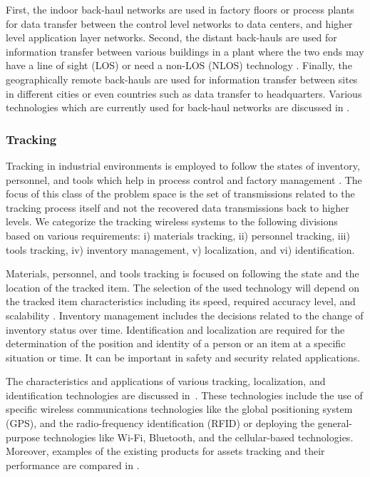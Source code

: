 First, the indoor back-haul networks are used in factory floors or process plants for data transfer between the control level networks to data centers, and higher level application layer networks. Second, the distant back-hauls are used for information transfer between various buildings in a plant where the two ends  may have a line of sight (LOS) or need a non-LOS (NLOS) technology \cite{PS-backhaul}. Finally, the geographically remote back-hauls are used for information transfer between sites in different cities or even countries such as data transfer to headquarters. Various technologies which are currently used for back-haul networks are discussed in \cite{PS-backhaul}.   
    
    \subsubsection{Tracking}
Tracking in industrial environments is employed to follow the states of inventory, personnel, and tools which help in process control and factory management \cite{PS_tracking2}. The focus of this class of the problem space is the set of transmissions related to the tracking process itself and not the recovered data transmissions back to higher levels. We categorize the tracking wireless systems to the following divisions based on various requirements: i) materials tracking, ii) personnel tracking, iii) tools tracking, iv) inventory management, v) localization, and vi) identification. 

Materials, personnel, and tools tracking is focused on following the state and the location of the tracked item. The selection of the used technology will depend on the tracked item characteristics including its speed, required accuracy level, and scalability \cite{PS-tracking1}. Inventory management includes the decisions related to the change of inventory status over time. Identification and localization are required for the determination of the position and identity of a person or an item at a specific situation or time. It can be important in safety and security related applications. 

The characteristics and applications of various tracking, localization, and identification technologies are discussed in~\cite{PS_tracking2}. These technologies include the use of specific wireless communications technologies like the global positioning system (GPS), and the radio-frequency identification (RFID) or deploying the general-purpose technologies like Wi-Fi, Bluetooth, and the cellular-based technologies. Moreover, examples of the existing products for assets tracking and their performance are compared in \cite{PS-tracking1}.  


